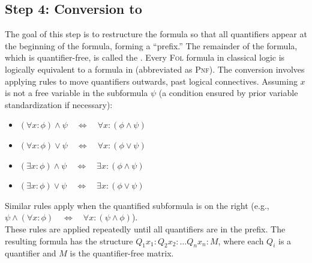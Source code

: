 \subsection{Step 4: Conversion to }
The goal of this step is to restructure the formula so that all quantifiers appear at the beginning of the
formula, forming a ``prefix.'' The remainder of the formula, which is quantifier-free, is called the
.  Every \textsc{Fol} formula in classical logic is logically equivalent to a formula in
  (abbreviated as \textsc{Pnf}). 
The conversion involves applying rules to move quantifiers outwards, past logical connectives. Assuming $x$ is
not a free variable in the subformula $\psi$ (a condition ensured by prior variable standardization if
necessary): 
\begin{itemize}
    \item $(\forall x: \phi) \land \psi \quad\Leftrightarrow\quad \forall x: (\phi \land \psi)$
    \item $(\forall x: \phi) \lor \psi \quad\Leftrightarrow\quad \forall x: (\phi \lor \psi)$
    \item $(\exists x: \phi) \land \psi \quad\Leftrightarrow\quad \exists x: (\phi \land \psi)$
    \item $(\exists x: \phi) \lor \psi \quad\Leftrightarrow\quad \exists x: (\phi \lor \psi)$
\end{itemize}
Similar rules apply when the quantified subformula is on the right (e.g.,
\\[0.2cm]
\hspace*{1.3cm}
$\psi \land (\forall x: \phi)  \quad\Leftrightarrow\quad \forall x: (\psi \land \phi)$).
\\[0.2cm]
These rules are applied repeatedly until all quantifiers are in the prefix. The
resulting formula has the structure $Q_1 x_1: Q_2 x_2: \dots Q_n x_n: M$, where each $Q_i$ is a quantifier and $M$
is the quantifier-free matrix. 


